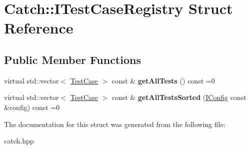 \hypertarget{structCatch_1_1ITestCaseRegistry}{}\section{Catch\+:\+:I\+Test\+Case\+Registry Struct Reference}
\label{structCatch_1_1ITestCaseRegistry}
\subsection*{Public Member Functions}
\begin{DoxyCompactItemize}
\item 
\mbox{\label{structCatch_1_1ITestCaseRegistry_ad6e4d4a621655123f73ae98cfeda063d}} 
virtual std\+::vector$<$ \hyperlink{classCatch_1_1TestCase}{Test\+Case} $>$ const  \& {\bfseries get\+All\+Tests} () const =0
\item 
\mbox{\label{structCatch_1_1ITestCaseRegistry_a33e46639d0319d35497c05bb5d02be5a}} 
virtual std\+::vector$<$ \hyperlink{classCatch_1_1TestCase}{Test\+Case} $>$ const  \& {\bfseries get\+All\+Tests\+Sorted} (\hyperlink{structCatch_1_1IConfig}{I\+Config} const \&config) const =0
\end{DoxyCompactItemize}


The documentation for this struct was generated from the following file\+:\begin{DoxyCompactItemize}
\item 
catch.\+hpp\end{DoxyCompactItemize}
